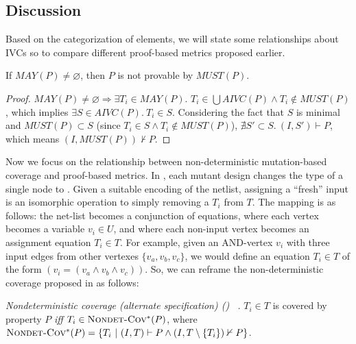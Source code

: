 \subsection{Discussion}
\label{subsec:method-disc}


Based on the categorization of elements, we will state some relationships about IVCs so to compare different proof-based metrics proposed earlier.

\begin{lemma}
  \label{lem:must-not-enough}
  If $MAY(P) \neq \varnothing$, then $P$ is not provable by $MUST(P)$.
\end{lemma}
\begin{proof}
  $MAY(P) \neq \varnothing \Rightarrow  \exists T_i \in MAY(P).$
$T_i \in \bigcup AIVC(P) \wedge T_i \notin MUST(P)$,
which implies $\exists S \in AIVC(P).~ T_i \in S$.
Considering the fact that $S$ is minimal and
$MUST(P) \subset S$ (since $T_i \in S \wedge T_i \notin MUST(P)$),
 $\nexists S' \subset S.~ (I,S') \vdash P$,  which means $(I, MUST(P)) \nvdash P$.
\end{proof}
\vspace{2mm}


Now we focus on the relationship between non-deterministic mutation-based coverage and proof-based metrics. In \cite{chockler2010coverage}, each mutant design changes the type of a single node to .
Given a suitable encoding of the netlist, assigning a ``fresh'' input is an isomorphic operation to simply removing a $T_i$ from $T$. The mapping is as follows: the net-list becomes a conjunction
of equations, where each vertex becomes a variable $v_i \in U$, and where each non-input vertex becomes an assignment equation $T_i \in T$.
For example, given an AND-vertex $v_i$ with three input edges from other vertexes $\{v_a, v_b, v_c\}$, we would define an equation $T_i \in T$ of the form $(v_i = (v_a \wedge v_b \wedge v_c))$.
%
So, we can reframe the non-deterministic coverage proposed in \cite{chockler2010coverage} as follows:

\begin{definition} {\emph{Nondeterministic coverage (alternate specification) (\nondetcovalt) ~\cite{chockler2010coverage}.} }
\label{def:non-det-2}
$T_i \in T$ is covered by property $P$ \emph{iff} $T_i \in \text{\sc Nondet-Cov$^{*}$} (P)$, where
$\text{\sc Nondet-Cov$^{*}$} (P) = \{T_i~|~ (I, T) \vdash P \wedge (I, T \setminus \{T_i\}) \nvdash P\}$.
\end{definition}


